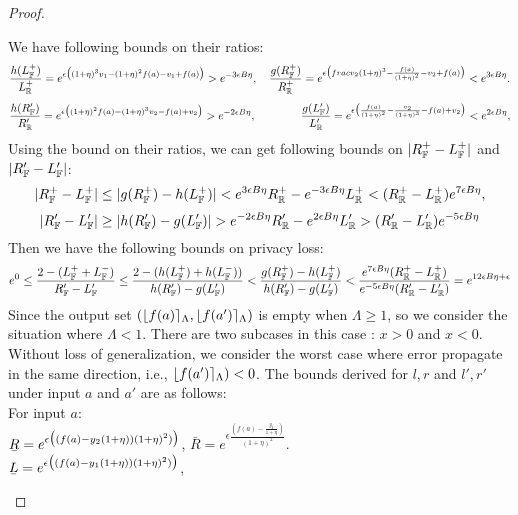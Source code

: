 \documentclass[a4paper,11pt]{article}
\begin{document}
\begin{proof}
\begin{itemize}
		We have following bounds on their ratios:
		\[
		\frac{h(L_{\mathbb{F}}^+)}{L_{\mathbb{R}}^+} 
		= e^{\epsilon 
		\big(
		(1 + \eta)^3 v_1 - (1 + \eta)^2f(a) - v_1 + f(a)
		\big)}
		> e^{-3\epsilon B \eta},
		~~~
		\frac{g{(R_{\mathbb{F}}^+)}}{R_{\mathbb{R}}^+} = e^{\epsilon 
		\big(
		frac{v_2}{(1 + \eta)^3} - \frac{f(a)}{(1 + \eta)^2} - v_2 + f(a)
		\big)}
		< e^{3\epsilon B \eta}.
		\]
		\[
		\frac{h(R_{\mathbb{F}}')}{R_{\mathbb{R}}'} = e^{\epsilon 
		\big(
		(1 + \eta)^2f(a) - (1 + \eta)^3 v_2 - f(a) + v_2
		\big)}
		> e^{-2\epsilon B \eta},
		~~~~~~~~~~~~
		\frac{g{(L_{\mathbb{F}}')}}{L_{\mathbb{R}}'} = e^{\epsilon 
		\big(
		\frac{f(a)}{(1 + \eta)^2} - \frac{v_2}{(1 + \eta)^3} - f(a) + v_2
		\big)}
		< e^{2\epsilon B \eta},
		\]
		Using the bound on their ratios, we can get following bounds on $|R_{\mathbb{F}}^+ - L_{\mathbb{F}}^+|$ 
		and $|R_{\mathbb{F}}' - L_{\mathbb{F}}'|$:
		\[
		|R_{\mathbb{F}}^+ - L_{\mathbb{F}}^+|
		\leq
		|g{(R_{\mathbb{F}}^+)} - h(L_{\mathbb{F}}^+)| 
		< e^{3\epsilon B \eta} R_{\mathbb{R}}^+ - e^{-3\epsilon B \eta}L_{\mathbb{R}}^+ 
		< (R_{\mathbb{R}}^+ - L_{\mathbb{R}}^+) e^{7\epsilon B \eta},
		\]
		\[
		|R_{\mathbb{F}}' - L_{\mathbb{F}}'|
		\geq
		|h{(R_{\mathbb{F}}')} - g(L_{\mathbb{F}}')| 
		> e^{-2\epsilon B \eta} R_{\mathbb{R}}' - e^{2\epsilon B \eta}L_{\mathbb{R}}' 
		> (R_{\mathbb{R}}' - L_{\mathbb{R}}') e^{-5\epsilon B \eta}
		\]
		Then we have the following bounds on privacy loss:
		\[
		e^0
		\leq
		\frac{2 - (L_{\mathbb{F}}^+ + L_{\mathbb{F}}^-)}
		{R_{\mathbb{F}}' - L_{\mathbb{F}}'}
		\leq
		\frac{2 - (h(L_{\mathbb{F}}^+) + h(L_{\mathbb{F}}^-))}
		{h(R_{\mathbb{F}}') - g(L_{\mathbb{F}}')}
		< \frac{g(R_{\mathbb{F}}^+) - h(L_{\mathbb{F}}^+)}
		{h(R_{\mathbb{F}}') - g(L_{\mathbb{F}}')}
		< \frac{e^{7\epsilon B \eta}
		(R_{\mathbb{R}}^+ - L_{\mathbb{R}}^+)}
		{e^{-5\epsilon B \eta} 
		(R_{\mathbb{R}}' - L_{\mathbb{R}}')}
		= e^{12\epsilon B \eta + \epsilon}
		\]
		Since the output set $(\lfloor f(a) \rceil_{\Lambda}, \lfloor f(a') \rceil_{\Lambda})$ is empty when $\Lambda \geq 1$, so we consider the situation where $\Lambda < 1$.
		There are two subcases in this case : $x >0$ and $x < 0$.
		Without loss of generalization, we consider the worst case where error propagate in the same direction, i.e., $\lfloor f(a') \rceil_{\Lambda}) < 0$. The bounds derived for $l, r$ and $l', r'$ under input $a$ and $a'$ are as follows:
		\\
		For input $a$:
		\\
		$\ubar{R} = e^{\epsilon 
				\big( (f(a) - y_2(1 + \eta)) (1 + \eta)^2) \big)}$, 
		$\bar{R} = e^{\epsilon 
				\frac{(f(a) - \frac{y_2}{1 + \eta})}{(1 + \eta)^2}}$.  
		\\
		$\ubar{L} = e^{\epsilon 
				\big( (f(a) - y_1(1 + \eta)) (1 + \eta)^2) \big)}$, 

\end{itemize}
\end{proof}
\end{document}
